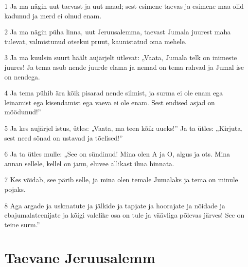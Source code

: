 \par 1 Ja ma nägin uut taevast ja uut maad; sest esimene taevas ja esimene maa olid kadunud ja merd ei olnud enam.
\par 2 Ja ma nägin püha linna, uut Jeruusalemma, taevast Jumala juurest maha tulevat, valmistunud otsekui pruut, kaunistatud oma mehele.
\par 3 Ja ma kuulsin suurt häält aujärjelt ütlevat: „Vaata, Jumala telk on inimeste juures! Ja tema asub nende juurde elama ja nemad on tema rahvad ja Jumal ise on nendega.
\par 4 Ja tema pühib ära kõik pisarad nende silmist, ja surma ei ole enam ega leinamist ega kisendamist ega vaeva ei ole enam. Sest endised asjad on möödunud!”
\par 5 Ja kes aujärjel istus, ütles: „Vaata, ma teen kõik uueks!” Ja ta ütles: „Kirjuta, sest need sõnad on ustavad ja tõelised!”
\par 6 Ja ta ütles mulle: „See on sündinud! Mina olen A ja O, algus ja ots. Mina annan sellele, kellel on janu, eluvee allikast ilma hinnata.
\par 7 Kes võidab, see pärib selle, ja mina olen temale Jumalaks ja tema on minule pojaks.
\par 8 Aga argade ja uskmatute ja jälkide ja tapjate ja hoorajate ja nõidade ja ebajumalateenijate ja kõigi valelike osa on tule ja väävliga põlevas järves! See on teine surm.”

\section*{Taevane Jeruusalemm}

